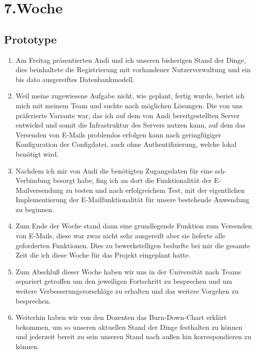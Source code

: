 \chapter{7.\hspace{0.5em}Woche}\label{wo7}

\section{Prototype}\label{wo7_1}

\begin{enumerate}[label={\Roman*)}]
	\item Am Freitag pr\"asentierten Andi und ich unseren bisherigen Stand der Dinge, dies beinhaltete die Registrierung mit
vorhandener Nutzerverwaltung und ein bis dato ausgereiftes Datenbankmodell.
	\item Weil meine zugewiesene Aufgabe nicht, wie geplant, fertig wurde, beriet ich mich mit meinem Team und suchte nach
m\"oglichen L\"osungen. Die von uns pr\"aferierte Variante war, das ich auf dem von Andi bereitgestellten Server entwickel und
somit die Infrastruktur des Servers nutzen kann, auf dem das Versenden von E-Mails problemlos erfolgen kann nach geringf\"ugiger
Konfiguration der Configdatei, auch ohne Authentifizierung, welche lokal ben\"otigt wird.
	\item Nachdem ich mir von Andi die ben\"otigten Zugangsdaten f\"ur eine ssh-Verbindung besorgt habe, fing ich an dort die
Funktionalit\"at der E-Mailversendung zu testen und nach erfolgreichem Test, mit der eigentlichen Implementierung der
E-Mailfunktionalit\"at f\"ur unsere bestehende Anwendung zu beginnen.
	\item Zum Ende der Woche stand dann eine grundlegende Funktion zum Versenden von E-Mails, diese war zwar nicht sehr
ausgereift aber sie lieferte alle geforderten Funktionen. Dies zu bewerkstelligen bedurfte bei mir die gesamte Zeit die ich diese
Woche f\"ur das Projekt eingeplant hatte.
	\item Zum Abschlu\ss{} dieser Woche haben wir uns in der Universit\"at nach Teams separiert getroffen um den jeweiligen
Fortschritt zu besprechen und um weitere Verbesserungsvorschl\"age zu erhalten und das weitere Vorgehen zu besprechen.
	\item Weiterhin haben wir von den Dozenten das Burn-Down-Chart erkl\"art bekommen, um so unseren aktuellen Stand der
Dinge festhalten zu k\"onnen und jederzeit bereit zu sein unseren Stand nach au\ss{}en hin korrespondieren zu k\"onnen.
\end{enumerate}